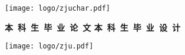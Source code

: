 \thispagestyle{empty}
\setcounter{page}{-1}


\vskip 10mm

\begin{center}
    \texttt{[image: logo/zjuchar.pdf]}
\end{center}

\begin{center}
     \heiti \bfseries
    {
        本~科~生~毕~业~论~文
    }
    {
        本~科~生~毕~业~设~计
    }
\end{center}

\vskip 20pt

\begin{center}
    \texttt{[image: logo/zju.pdf]}
\end{center}

\vskip 20pt

{
    \newcommand{\CoverTitle}{
        题目      &  \uline{\hfill \Title{} \hfill} \\
        ~ & ~\\
    }
}
{
    \newcommand{\CoverTitle}{
        题目      &  \uline{\hfill \TitleLineOne{} \hfill} \\
        ~        & \uline{\hfill \TitleLineTwo{} \hfill} \\
    }
}


